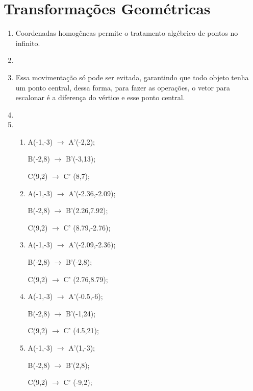 \section*{Transformações Geométricas}

	\begin{enumerate}[label=\arabic*)]
	    \setlength\itemsep{1em}
	    
		\item Coordenadas homogêneas permite o tratamento algébrico de pontos
	   no infinito.
		
		\item 

		\item 
		Essa movimentação só pode ser evitada, garantindo que todo objeto tenha um 
		ponto central, dessa forma, para fazer as operações, o vetor para escalonar é a diferença do
		vértice e esse ponto central.

		\item 

		\item 
				
				\begin{enumerate}[label=\alph*.]
				   \setlength\itemsep{1em}
					\item					
					   				
					   				A(-1,-3) $\rightarrow$ A'(-2,2);
				
									B(-2,8)  $\rightarrow$ B'(-3,13);
				
									C(9,2)  $\rightarrow$ C' (8,7);
					\item 
					
								    A(-1,-3) $\rightarrow$ A'(-2.36,-2.09);
				
									B(-2,8)  $\rightarrow$ B'(2.26,7.92);
				
									C(9,2)  $\rightarrow$ C' (8.79,-2.76);
					\item 
					
									A(-1,-3) $\rightarrow$ A'(-2.09,-2.36);
				
									B(-2,8)  $\rightarrow$ B'(-2,8);
				
									C(9,2)  $\rightarrow$ C' (2.76,8.79);
					\item
					
									A(-1,-3) $\rightarrow$ A'(-0.5,-6);
				
									B(-2,8)  $\rightarrow$ B'(-1,24);
				
									C(9,2)  $\rightarrow$ C' (4.5,21);
					\item
									
									A(-1,-3) $\rightarrow$ A'(1,-3);
				
									B(-2,8)  $\rightarrow$ B'(2,8);
				
									C(9,2)  $\rightarrow$ C' (-9,2);
								
				\end{enumerate}

	\end{enumerate}
	
